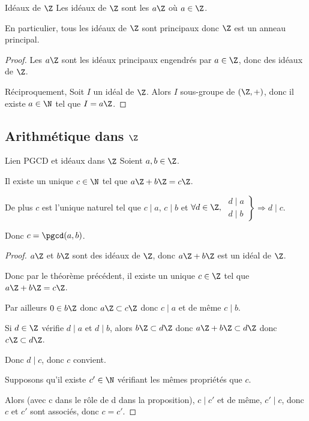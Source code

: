 \begin{theoreme}{Idéaux de $\Z$}{}
    Les idéaux de $\Z$ sont les $a \Z$ où $a \in \Z$.

    En particulier, tous les idéaux de $\Z$ sont principaux donc $\Z$ est un anneau principal.
\end{theoreme}

\begin{proof}
    Les $a \Z$ sont les idéaux principaux engendrés par $a \in \Z$, donc des idéaux de $\Z$.

    Réciproquement, Soit $I$ un idéal de $\Z$. Alors $I$ sous-groupe de $(\Z, +)$, donc il existe 
    $a \in \N$ tel que $I = a \Z$.
\end{proof}

\subsection{Arithmétique dans \texorpdfstring{$\Z$}{Z}}

\begin{theoreme}{Lien PGCD et idéaux dans $\Z$}{}
    Soient $a, b \in \Z$.
    
    Il existe un unique $c \in \N$ tel que $a \Z + b \Z = c \Z$.
    
    De plus $c$ est l'unique naturel tel que $c \mid a $, $c \mid b$ et $\forall d \in \Z, $
    $\left. \begin{aligned}
        d \mid a \\
        d \mid b
    \end{aligned} \right\} \Rightarrow d \mid c$.

    Donc $c = \pgcd(a, b)$.
\end{theoreme}

\begin{proof}
    $a \Z$ et $b \Z$ sont des idéaux de $\Z$, donc $a \Z + b \Z$ est un idéal de $\Z$.

    Donc par le théorème précédent, il existe un unique $c \in \Z$ tel que $a \Z + b \Z = c \Z$.

    Par ailleurs $0 \in b \Z$ donc $a \Z \subset c \Z$ donc $c \mid a $ et de même $c \mid b$.

    Si $d \in \Z$ vérifie $d \mid a$ et $d \mid b$, alors $b \Z \subset d \Z$ donc $a\Z + b\Z \subset d\Z$ donc $c \Z \subset d \Z$. 

    Donc $d \mid c$, donc $c $ convient. 

    \svspace Supposons qu'il existe $c' \in \N$ vérifiant les mêmes propriétés que $c$. 

    Alors (avec c dans le rôle de d dans la proposition), 
    $c \mid c'$ et de même, $c' \mid c$, donc $c$ et $c'$ sont associés, donc $c = c'$.
\end{proof}


